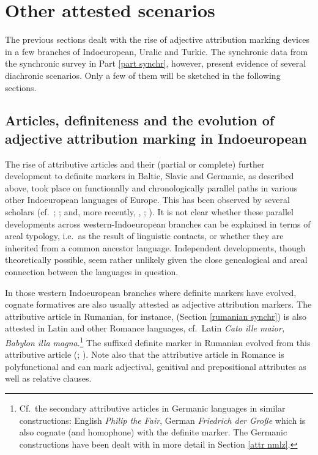 {\section{Other attested scenarios}
The previous sections dealt with the rise of adjective attribution marking devices in a few branches of Indoeuropean, Uralic and Turkic. The synchronic data from the synchronic survey in Part \ref{part synchr}, however, present evidence of several diachronic scenarios. Only a few of them will be sketched in the following sections.

\subsection[Articles, definiteness and adjective attribution]{Articles, definiteness and the evolution of adjective attribution marking in Indoeuropean}
The rise of attributive articles and their (partial or complete) further development to definite markers in Baltic, Slavic and Germanic, as described above, took place  on functionally and chronologically parallel paths in various other Indoeuropean languages of Europe. This has been observed by several scholars (cf.~\citealt{brugmann-etal1916}; \citealt{gamillscheg1937}; \citealt{heinrichs1954} and, more recently, \citealt{nocentini1996}, \citealt{philippi1997}; \citealt{himmelmann1997}). It is not clear whether these parallel developments across western-Indoeuropean branches can be explained in terms of areal typology, i.e.~as the result of linguistic contacts, or whether they are inherited from a common ancestor language. Independent developments, though theoretically possible, seem rather unlikely given the close genealogical and areal connection between the languages in question.

In those western Indoeuropean branches where definite markers have evolved, cognate formatives are also usually attested as adjective attribution markers. The attributive article in Rumanian, for instance, (Section \ref{rumanian synchr}) is also attested in Latin and other Romance languages, cf.~Latin \textit{Cato ille maior, Babylon illa magna}.\footnote{Cf.~the secondary attributive articles in Germanic languages in similar constructions: English \textit{Philip the Fair}, German \textit{Friedrich der Große} which is also cognate (and homophone) with the definite marker. The Germanic constructions have been dealt with in more detail in Section \ref{attr nmlz}.} The suffixed definite marker in Rumanian evolved from this attributive article (\citealt{gamillscheg1937}; \citealt[5]{nocentini1996}). Note also that the attributive article in Romance is polyfunctional and can mark adjectival, genitival and prepositional attributes as well as relative clauses.

}
